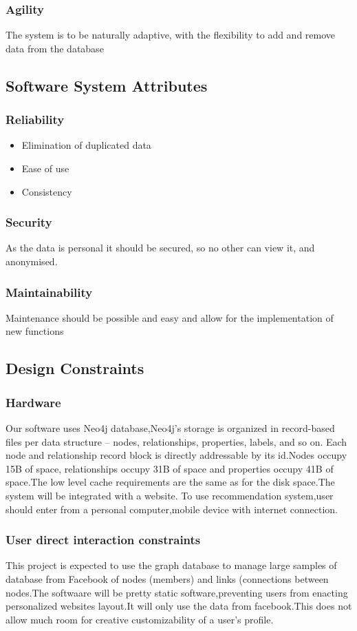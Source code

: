 \documentclass[11pt]{article}
\begin{document}
\subsubsection{Agility}
The system is to be naturally adaptive, with the flexibility to add and remove data from the database

\subsection{Software System Attributes}
\subsubsection{Reliability}
\begin{itemize}
\item Elimination of duplicated data
\item Ease of use
\item Consistency
\end{itemize}

\subsubsection{Security}
As the data is personal it should be secured, so no other can view it, and anonymised.

\subsubsection{Maintainability}
Maintenance should be possible and easy and allow for the implementation of new functions

\subsection{Design Constraints}
\subsubsection{Hardware}
Our software uses Neo4j database,Neo4j’s storage is organized in record-based files per data structure – nodes, relationships, properties, labels, and so on. Each node and relationship record block is directly addressable by its id.Nodes occupy 15B
of space, relationships occupy 31B of space and properties occupy 41B of space.The low level cache requirements are the same as for the disk space.The
system  will  be  integrated  with  a  website.  To  use  recommendation  system,user 
should enter from a personal computer,mobile device with internet connection.

\subsubsection{User direct interaction constraints}
This project is expected to use the graph database to
manage large samples of database from Facebook of nodes (members) and links (connections
between nodes.The softwaare will be pretty static software,preventing users from enacting personalized websites layout.It will only use the data from facebook.This does not allow much room for creative customizability of a user's profile.
\end{document}
